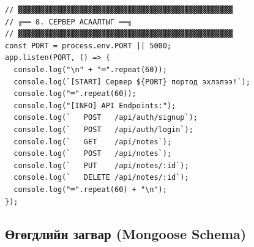 \begin{lstlisting}[caption={server.js -- Express серверийн бүрэн тохиргоо}]
// ▓▓▓▓▓▓▓▓▓▓▓▓▓▓▓▓▓▓▓▓▓▓▓▓▓▓▓▓▓▓▓▓▓▓▓▓▓▓▓▓▓▓▓▓▓▓▓▓▓
// ╔══ 8. СЕРВЕР АСААЛТЫГ ══╗
// ▓▓▓▓▓▓▓▓▓▓▓▓▓▓▓▓▓▓▓▓▓▓▓▓▓▓▓▓▓▓▓▓▓▓▓▓▓▓▓▓▓▓▓▓▓▓▓▓▓
const PORT = process.env.PORT || 5000;
app.listen(PORT, () => {
  console.log("\n" + "═".repeat(60));
  console.log(`[START] Сервер ${PORT} портод эхлэлээ!`);
  console.log("═".repeat(60));
  console.log("[INFO] API Endpoints:");
  console.log(`   POST   /api/auth/signup`);
  console.log(`   POST   /api/auth/login`);
  console.log(`   GET    /api/notes`);
  console.log(`   POST   /api/notes`);
  console.log(`   PUT    /api/notes/:id`);
  console.log(`   DELETE /api/notes/:id`);
  console.log("═".repeat(60) + "\n");
});
\end{lstlisting}

\subsection{Өгөгдлийн загвар (Mongoose Schema)}


